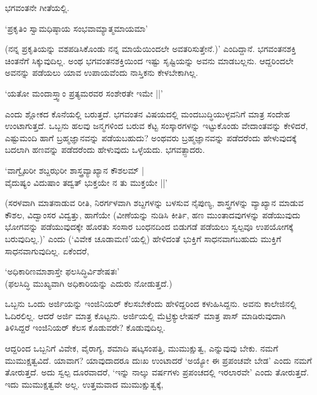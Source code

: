 ಭಗವಂತನೇ ಗೀತೆಯಲ್ಲಿ.

\begin{shloka}
`ಪ್ರಕೃತಿಂ ಸ್ವಾಮಧಿಷ್ಠಾಯ ಸಂಭವಾಮ್ಯಾತ್ಮಮಾಯಮಾ'
\end{shloka}

(ನನ್ನ ಪ್ರಕೃತಿಯನ್ನು ವಶಪಡಿಸಿಕೊಂಡು ನನ್ನ ಮಾಯೆಯಿಂದಲೇ ಅವತರಿಸುತ್ತೇನೆ.)' ಎಂದಿದ್ದಾನೆ. ಭಗವಂತನಶಕ್ತಿ ಚಿಂತನೆಗೆ ಸಿಕ್ಕುವುದಿಲ್ಲ. ಅಂಥ ಭಗವಂತನಶಕ್ತಿಯಿಂದ ಇಷ್ಟು ಸೃಷ್ಟಿಯನ್ನು ಅವನು ಮಾಡಬಲ್ಲನು. ಆದ್ದರಿಂದಲೇ ಅವನನ್ನು ಪಡೆಯಲು ಯಾವ ಉಪಾಯವೆಂದು ನಾಸ್ತಿಕನು ಕೇಳಬೇಕಾಗಿಲ್ಲ.

\begin{shloka}
`ಯತೋ ಮಂದಾಸ್ತ್ವಾಂ ಪ್ರತ್ಯಮರವರ ಸಂಶೇರತೇ ಇಮೇ ||'
\end{shloka}

ಎಂದು ಶ್ಲೋಕದ ಕೊನೆಯಲ್ಲಿ ಬರುತ್ತದೆ. ಭಗವಂತನ ವಿಷಯದಲ್ಲಿ ಮಂದಬುದ್ಧಿಯುಳ್ಳವನಿಗೆ ಮಾತ್ರ ಸಂದೇಹ ಉಂಟಾಗುತ್ತದೆ. ಒಬ್ಬನು ಹಲವು ಜನ್ಮಗಳಿಂದ ಬರುವ ಕೆಟ್ಟ ಸಂಸ್ಕಾರಗಳನ್ನು ಇಟ್ಟುಕೊಂಡು ವೇದಾಂತವನ್ನು ಕೇಳಿದರೆ, ಎಷ್ಟುಮಂದಿ ಹಾಗೆ ಬ್ರಹ್ಮಜ್ಞಾನವನ್ನು ಪಡೆಯಬಹುದು? ಅಂಥವರು ಬ್ರಹ್ಮಜ್ಞಾನವನ್ನು ಪಡೆದರೆಂದು ಹೇಳುವುದಕ್ಕೆ ಬದಲಾಗಿ ಹಣವನ್ನು ಪಡೆದರೆಂದು ಹೇಳುವುದು ಒಳ್ಳೆಯದು. ಭಗವತ್ಪ್ಪಾದರು.

\begin{shloka}
`ವಾಗ್ವೈಖರೀ ಶಬ್ದಝರೀ ಶಾಸ್ತ್ರವ್ಯಾಖ್ಯಾನ ಕೌಶಲಮ್ |\\
ವೈದುಷ್ಯಂ ವಿದುಷಾಂ ತದ್ವತ್ ಭುಕ್ತಯೇ ನ ತು ಮುಕ್ತಯೇ ||'
\end{shloka}

(ಸರಳವಾಗಿ ಮಾತನಾಡುವ ರೀತಿ, ನಿರರ್ಗಳವಾಗಿ ಶಬ್ದಗಳನ್ನು ಬಳಸುವ ನೈಪುಣ್ಯ, ಶಾಸ್ತ್ರಗಳನ್ನು ವ್ಯಾಖ್ಯಾನ ಮಾಡುವ ಕೌಶಲ, ವಿದ್ವಾಂಸರ ವಿದ್ವತ್ತು, ಹಾಗೆಯೇ (ವೀಣೆಯನ್ನು ನುಡಿಸಿ ಕೀರ್ತಿ, ಹಣ ಮುಂತಾದವುಗಳನ್ನು ಪಡೆಯುವುದು ಭೋಗವನ್ನು ಪಡೆಯುವುದಕ್ಕೇ ಹೊರತು ಸಂಸಾರ ಬಂಧನದಿಂದ ಬಿಡುಗಡೆ ಪಡೆಯಲು ಸ್ವಲ್ಪವೂ ಉಪಯೋಗಕ್ಕೆ ಬರುವುದಿಲ್ಲ.)' ಎಂದು (`ವಿವೇಕ ಚೂಡಾಮಣಿ'ಯಲ್ಲಿ) ಹೇಳಿದಂತೆ ಭುಕ್ತಿಗೆ ಸಾಧನವಾಗಬಹುದು ಮುಕ್ತಿಗೆ ಸಾಧನವಾಗುವುದಿಲ್ಲ. ಏಕೆಂದರೆ,

\begin{shloka}
`ಅಧಿಕಾರಿಣಮಾಶಾಸ್ತೇ ಫಲಸಿದ್ಧಿರ್ವಿಶೇಷತಃ'\\
(ಫಲಸಿದ್ಧಿ ಮುಖ್ಯವಾಗಿ ಅಧಿಕಾರಿಯನ್ನು ಎದುರು ನೋಡುತ್ತದೆ.)
\end{shloka}

ಒಬ್ಬನು ಒಂದು ಅರ್ಜಿಯನ್ನು ಇಂಜಿನಿಯರ್ ಕೆಲಸಬೇಕೆಂದು ಹೇಳಿದ್ದರಿಂದ ಕಳುಹಿಸಿದ್ದನು. ಅವನು ಕಾಲೇಜಿನಲ್ಲಿ ಓದಿರಲಿಲ್ಲ. ಆದರೆ ಅರ್ಜಿ ಮಾತ್ರ ಕೊಟ್ಟನು. ಅರ್ಜಿಯಲ್ಲಿ ಮೆಟ್ರಿಕ್ಯುಲೇಷನ್ ಮಾತ್ರ ಪಾಸ್ ಮಾಡಿರುವುದಾಗಿ ತಿಳಿಸಿದ್ದರೆ ಇಂಜಿನಿಯರ್ ಕೆಲಸ ಕೊಡುವರೇ? ಕೊಡುವುದಿಲ್ಲ.

ಆದ್ದರಿಂದ ಒಬ್ಬನಿಗೆ ವಿವೇಕ, ವೈರಾಗ್ಯ, ಶಮಾದಿ ಷಟ್ಕಸಂಪತ್ತಿ, ಮುಮುಕ್ಷುತ್ವ, ಎನ್ನುವುವು ಬೇಕು. ನಮಗೆ ಮುಮುಕ್ಷತ್ವವಿದೆ. ಯಾವಾಗ? ಯಾವುದಾದರೂ ದುಃಖ ಉಂಟಾದರೆ `ಅಯ್ಯೋ ಈ ಪ್ರಪಂಚವೇ ಬೇಡ' ಎಂದು ನಮಗೆ ತೋರುತ್ತದೆ. ಅದು ಸ್ವಲ್ಪ ದೂರವಾದರೆ, `ಇನ್ನು ನಾಲ್ಕು ವರ್ಷಗಳು ಪ್ರಪಂಚದಲ್ಲಿ ಇರಲಾರವೇ' ಎಂದು ತೋರುತ್ತದೆ. ಇದು ಮುಮುಕ್ಷತ್ವವೇ ಅಲ್ಲ. ಉತ್ತಮವಾದ ಮುಮುಕ್ಷುತ್ವಕ್ಕೆ,

